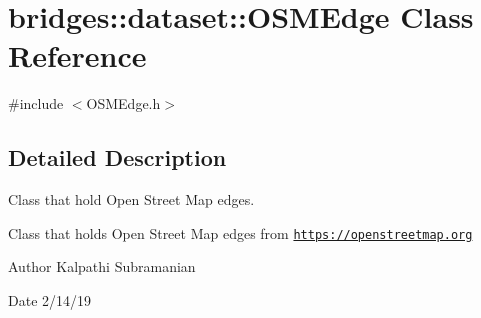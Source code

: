\hypertarget{classbridges_1_1dataset_1_1_o_s_m_edge}{}\section{bridges\+:\+:dataset\+:\+:O\+S\+M\+Edge Class Reference}
\label{classbridges_1_1dataset_1_1_o_s_m_edge}


{\ttfamily \#include $<$O\+S\+M\+Edge.\+h$>$}



\subsection{Detailed Description}
Class that hold Open Street Map edges. 

Class that holds Open Street Map edges from \href{https://openstreetmap.org}{\tt https\+://openstreetmap.\+org}

\begin{DoxyAuthor}{Author}
Kalpathi Subramanian 
\end{DoxyAuthor}
\begin{DoxyDate}{Date}
2/14/19 
\end{DoxyDate}
